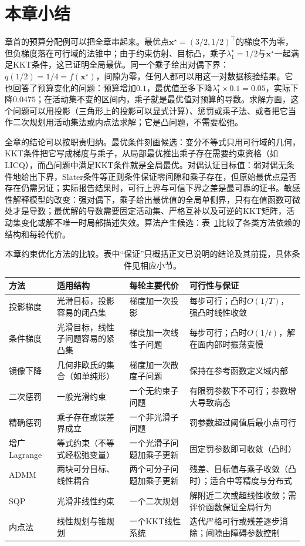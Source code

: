 \section{本章小结}
\label{sec:opt-con-summary}

章首的预算分配例可以把全章串起来。最优点$\bm x^\star=(3/2,1/2)^\top$的梯度不为零，但负梯度落在可行域的法锥中；由于约束仿射、目标凸，乘子$\lambda_1^\star=1/2$与$\bm x^\star$一起满足KKT条件，这已证明全局最优。同一个乘子给出对偶下界：$q(1/2)=1/4=f(\bm x^\star)$，间隙为零，任何人都可以用这一对数据核验结果。它也回答了预算变化的问题：预算增加$0.1$，最优值至多下降$\lambda_1^\star\times0.1=0.05$，实际下降$0.0475$；在活动集不变的区间内，乘子就是最优值对预算的导数。求解方面，这个问题可以用投影（三角形上的投影可以显式计算）、惩罚或乘子法、或者把它当作二次规划用活动集法或内点法求解；它是凸问题，不需要松弛。

全章的结论可以按职责归纳。最优条件刻画候选：变分不等式只用可行域的几何，KKT条件把它写成梯度与乘子，从局部最优推出乘子存在需要约束资格（如LICQ），而凸问题中满足KKT条件就是全局最优。对偶认证目标值：弱对偶无条件地给出下界，Slater条件等正则条件保证零间隙和乘子存在，但原始最优点是否存在仍需另证；实际报告结果时，可行上界与可信下界之差是最可靠的证书。敏感性解释模型的改变：强对偶下，乘子给出最优值的全局单侧界，只有在值函数可微处才是导数；最优解的导数需要固定活动集、严格互补以及可逆的KKT矩阵，活动集变化或解不唯一时局部描述失效。算法产生候选：表~\ref{tab:opt-con-methods}比较了各类方法依赖的结构和每轮代价。

\begin{table}[!htbp]
  \centering\small
  \begin{tabularx}{\linewidth}{@{}lXXX@{}}
    \toprule
    方法 & 适用结构 & 每轮主要代价 & 可行性与保证 \\
    \midrule
    投影梯度 & 光滑目标，投影容易的闭凸集 & 梯度加一次投影 & 每步可行；凸时$O(1/T)$，强凸时线性收敛 \\
    条件梯度 & 光滑目标，线性子问题容易的紧凸集 & 梯度加一次线性子问题 & 每步可行；凸时$O(1/t)$，解在面内部时振荡变慢 \\
    镜像下降 & 几何非欧氏的集合（如单纯形） & 梯度加一次散度子问题 & 保持在参考函数定义域内部 \\
    二次惩罚 & 一般光滑约束 & 一个无约束子问题 & 有限罚参数下不可行；参数增大导致病态 \\
    精确惩罚 & 乘子存在或误差界成立 & 一个非光滑子问题 & 罚参数超过阈值后最小点可行 \\
    增广Lagrange & 等式约束（不等式经松弛变量） & 一个光滑子问题加乘子更新 & 固定罚参数即可收敛（凸时） \\
    ADMM & 两块可分目标、线性耦合 & 两个可分子问题加乘子更新 & 残差、目标值与乘子收敛（凸时）；适合中等精度与分布式 \\
    SQP & 光滑非线性约束 & 一个二次规划 & 解附近二次或超线性收敛；需评价函数保证全局行为 \\
    内点法 & 线性规划与锥规划 & 一个KKT线性系统 & 迭代严格可行或残差逐步消除；间隙由障碍参数控制 \\
    \bottomrule
  \end{tabularx}
  \caption{本章约束优化方法的比较。表中“保证”只概括正文已说明的结论及其前提，具体条件见相应小节。}
  \label{tab:opt-con-methods}
\end{table}

